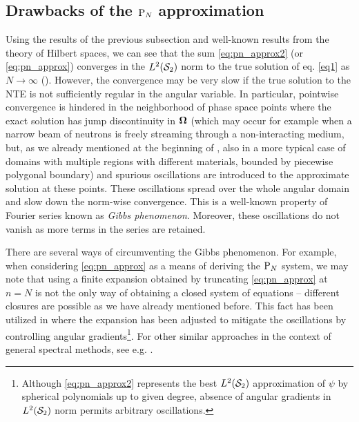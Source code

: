 \subsection{Drawbacks of the $\PN$ approximation} \label{sec:drawbacksPN}
Using the results of the previous subsection and well-known results from the theory of Hilbert spaces, we can see that
the sum \eqref{eq:pn_approx2} (or \eqref{eq:pn_approx}) converges in the $\Lp[2](\Sphere)$ norm to the true solution of
eq. \eqref{eq1} as $N\to\infty$ (\cite[Thm. 3.54]{Schreiner}). However, the convergence may be very slow if the true
solution to the NTE is not sufficiently regular in the angular variable. In particular, pointwise convergence is hindered in the neighborhood of
phase space points where the exact solution has jump discontinuity in $\bomega$ (which may occur for example
when a narrow beam of neutrons is freely streaming through a non-interacting medium, but, as we already mentioned at the
beginning of , also in a more typical case of domains with multiple regions with different materials,
bounded by piecewise polygonal boundary) and spurious oscillations are introduced to the approximate solution at these points.
These oscillations spread over the whole angular domain and slow down the norm-wise convergence. This is a well-known
property of Fourier series known as \textit{Gibbs
phenomenon}.
Moreover, these oscillations do not vanish as more terms in the series are retained. 

There are several ways of
circumventing the Gibbs phenomenon. For example, when considering \eqref{eq:pn_approx} as a means of deriving the $\PN$
system, we may note that using a finite expansion obtained by truncating \eqref{eq:pn_approx} at $n=N$ is not the only
way of obtaining a closed system of equations -- different closures are possible as we have already mentioned before.
This fact has been utilized in \cite{McClarren3} where the expansion has been adjusted to mitigate the oscillations by controlling
angular gradients\footnote{Although \eqref{eq:pn_approx2} represents the best $\Lp[2](\Sphere)$
approximation of $\psi$ by spherical polynomials up to given degree, absence of angular gradients in 
$\Lp[2](\Sphere)$ norm permits arbitrary \nolinebreak oscillations.}. For other similar approaches in the context of
general spectral methods, see e.g. \cite{Tanner}.


